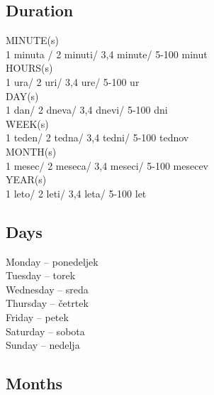 \subsection{Duration}

MINUTE(s)\\ 
1 minuta / 2 minuti/ 3,4 minute/ 5-100 minut\\
HOURS(s) \\
1 ura/ 2 uri/ 3,4 ure/ 5-100 ur\\
DAY(s) \\
1 dan/ 2 dneva/ 3,4 dnevi/ 5-100 dni\\
WEEK(s) \\
1 teden/ 2 tedna/ 3,4 tedni/ 5-100 tednov\\
MONTH(s) \\
1 mesec/ 2 meseca/ 3,4 meseci/ 5-100 mesecev\\
YEAR(s) \\
1 leto/ 2 leti/ 3,4 leta/ 5-100 let\\

\subsection{Days}

Monday -- ponedeljek\\
Tuesday -- torek\\
Wednesday -- sreda\\
Thursday -- četrtek\\
Friday -- petek\\
Saturday -- sobota\\
Sunday -- nedelja\\

\subsection{Months}


